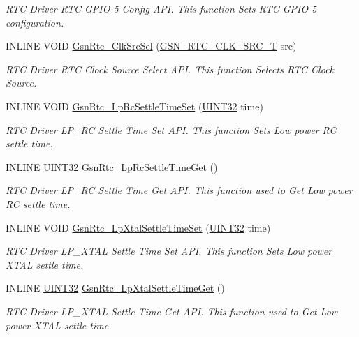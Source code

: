 \begin{DoxyCompactItemize}
\begin{DoxyCompactList}\small\item\em RTC Driver RTC GPIO-\/5 Config API. This function Sets RTC GPIO-\/5 configuration. \end{DoxyCompactList}\item 
INLINE VOID \hyperlink{a00651_ga4a163d7eb12d94ff92451b040f3863ec}{GsnRtc\_\-ClkSrcSel} (\hyperlink{a00651_gadb97e494297aadf7b5dda5f239d96c80}{GSN\_\-RTC\_\-CLK\_\-SRC\_\-T} src)
\begin{DoxyCompactList}\small\item\em RTC Driver RTC Clock Source Select API. This function Selects RTC Clock Source. \end{DoxyCompactList}\item 
INLINE VOID \hyperlink{a00651_gacd65e7f250f4ff9d765a52cb7a98364d}{GsnRtc\_\-LpRcSettleTimeSet} (\hyperlink{a00660_gae1e6edbbc26d6fbc71a90190d0266018}{UINT32} time)
\begin{DoxyCompactList}\small\item\em RTC Driver LP\_\-RC Settle Time Set API. This function Sets Low power RC settle time. \end{DoxyCompactList}\item 
INLINE \hyperlink{a00660_gae1e6edbbc26d6fbc71a90190d0266018}{UINT32} \hyperlink{a00651_ga6a60c0b7cae76518688a439962271516}{GsnRtc\_\-LpRcSettleTimeGet} ()
\begin{DoxyCompactList}\small\item\em RTC Driver LP\_\-RC Settle Time Get API. This function used to Get Low power RC settle time. \end{DoxyCompactList}\item 
INLINE VOID \hyperlink{a00651_ga538ed2973406041682e66fd8034a0134}{GsnRtc\_\-LpXtalSettleTimeSet} (\hyperlink{a00660_gae1e6edbbc26d6fbc71a90190d0266018}{UINT32} time)
\begin{DoxyCompactList}\small\item\em RTC Driver LP\_\-XTAL Settle Time Set API. This function Sets Low power XTAL settle time. \end{DoxyCompactList}\item 
INLINE \hyperlink{a00660_gae1e6edbbc26d6fbc71a90190d0266018}{UINT32} \hyperlink{a00651_ga1274c4c1efb74b9a17b712f530363ccb}{GsnRtc\_\-LpXtalSettleTimeGet} ()
\begin{DoxyCompactList}\small\item\em RTC Driver LP\_\-XTAL Settle Time Get API. This function used to Get Low power XTAL settle time. \end{DoxyCompactList}\item 

\end{DoxyCompactItemize}
